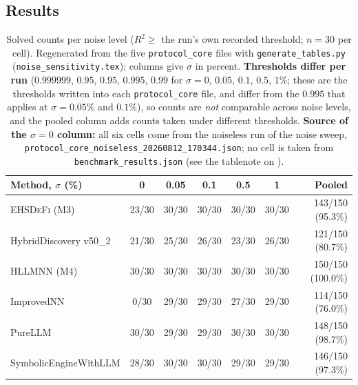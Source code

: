\documentclass[twoside,11pt]{article}
\newcommand{\EHD}{\textsc{EHSDeFi}}
\newcommand{\HSL}{\textsc{HLLMNN}}
\newcommand{\Rsq}{R^{2}}
\begin{document}
\subsection{Results}

\begin{table}[H]
\centering
\caption{Solved counts per noise level ($\Rsq\geq$ the run's own recorded
  threshold; $n=30$ per cell). Regenerated from the five \texttt{protocol\_core}
  files with \texttt{generate\_tables.py} (\texttt{noise\_sensitivity.tex});
  columns give $\sigma$ in percent. \textbf{Thresholds differ per run}
  ($0.999999$, $0.95$, $0.95$, $0.995$, $0.99$ for $\sigma=0$, $0.05$,
  $0.1$, $0.5$, $1\%$; these are the thresholds written into each
  \texttt{protocol\_core} file, and differ from the $0.995$ that
   applies at $\sigma=0.05\%$ and $0.1\%$), so counts are \emph{not} comparable across noise
  levels, and the pooled column adds counts taken under different thresholds.
  \textbf{Source of the $\sigma=0$ column:} all six cells come from the noiseless run of the noise sweep, \texttt{protocol\_core\_noiseless\_20260812\_170344.json}; no cell is taken from \texttt{benchmark\_results.json} (see the tablenote on ).}
\label{tab:noise_sensitivity}
\small
\setlength{\tabcolsep}{4pt}
\begin{tabular}{@{}l c c c c c r@{}}
\toprule
\textbf{Method, $\sigma$ (\%)} & \textbf{0} & \textbf{0.05} & \textbf{0.1} & \textbf{0.5} & \textbf{1} & \textbf{Pooled}\\
\midrule
\EHD{} (M3)            & 23/30 & 30/30 & 30/30 & 30/30 & 30/30 & 143/150 (95.3\%)\\
HybridDiscovery v50\_2 & 21/30 & 25/30 & 26/30 & 23/30 & 26/30 & 121/150 (80.7\%)\\
\HSL{} (M4)            & 30/30 & 30/30 & 30/30 & 30/30 & 30/30 & 150/150 (100.0\%)\\
ImprovedNN             &  0/30 & 29/30 & 29/30 & 27/30 & 29/30 & 114/150 (76.0\%)\\
PureLLM                & 30/30 & 29/30 & 29/30 & 30/30 & 30/30 & 148/150 (98.7\%)\\
SymbolicEngineWithLLM  & 28/30 & 30/30 & 30/30 & 29/30 & 29/30 & 146/150 (97.3\%)\\
\bottomrule
\end{tabular}
\end{table}
\end{document}
